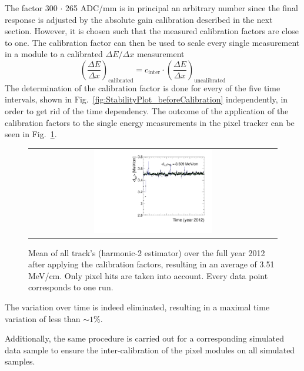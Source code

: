 The factor 300 $\cdot$ 265 ADC/mm is in principal an arbitrary number since the final response is adjusted by the absolute gain calibration described in the next section.
However, it is chosen such that the measured calibration factors are close to one.
The calibration factor can then be used to scale every single measurement in a module to a calibrated $\Delta E/\Delta x$ measurement
\begin{equation}
\left( \frac{\Delta E}{\Delta x}\right)_{\text{calibrated}}=c_{\text{inter}} \cdot \left(\frac{\Delta E}{\Delta x}\right)_{\text{uncalibrated}}
\end{equation}
The determination of the calibration factor is done for every of the five time intervals, shown in Fig.~\ref{fig:StabilityPlot_beforeCalibration} independently, in order to get rid of the time dependency. 
The outcome of the application of the calibration factors to the single energy measurements in the pixel tracker can be seen in Fig.~\ref{fig:StabilityPlot_afterCalibration}.
\begin{figure}[!b]
  \centering 
  \begin{tabular}{c}
  \includegraphics[width=0.49\textwidth]{figures/analysis/PixelCalibration/StabilityPlot_Pixel_afterCalibration_withoutStepFits_NEW.pdf}
  \end{tabular}
  \caption{Mean of all track's \dedx (harmonic-2 estimator) over the full year 2012 after applying the calibration factors, resulting in an average \dedx of 3.51 MeV/cm. Only pixel hits are taken into account. Every data point corresponds to one run.} 
  \label{fig:StabilityPlot_afterCalibration}
\end{figure}
The variation over time is indeed eliminated, resulting in a maximal time variation of less than $\sim1$\%.


Additionally, the same procedure is carried out for a corresponding simulated data sample to ensure the inter-calibration of the pixel modules on all simulated samples.

